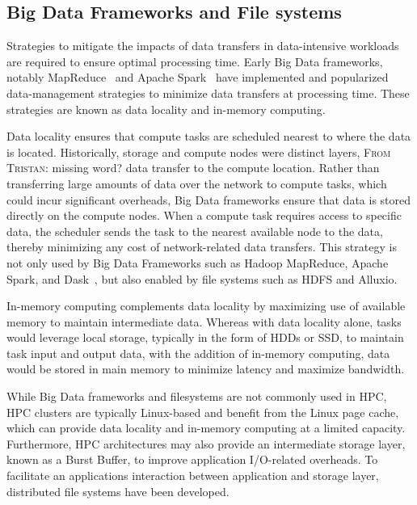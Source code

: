 \documentclass[10pt,journal,compsoc]{IEEEtran}
\newcommand{\TG}[1]{\color{red}\textsc{From Tristan}: #1\xspace\color{black}}
\begin{document}
\subsection{Big Data Frameworks and File systems}

      Strategies to mitigate the impacts of data transfers in data-intensive
      workloads are required to ensure optimal processing time. Early Big Data
      frameworks, notably MapReduce~\cite{dean2008mapreduce} and Apache
      Spark~\cite{zaharia2016apache} have implemented and popularized
      data-management strategies to minimize data transfers at processing time.
      These strategies are known as data locality and in-memory computing.

      Data locality ensures that compute tasks are scheduled nearest to where
      the data is located. Historically, storage and compute nodes were distinct
      layers, \TG{missing word?} data transfer to the compute location. Rather than transferring
      large amounts of data over the network to compute tasks, which could incur
      significant overheads, Big Data frameworks ensure that data is stored
      directly on the compute nodes. When a compute task requires access to
      specific data, the scheduler sends the task to the nearest available node
      to the data, thereby minimizing any cost of network-related data
      transfers. This strategy is not only used by Big Data Frameworks such as
      Hadoop MapReduce, Apache Spark, and Dask~\cite{rocklin2015dask}, but also
      enabled by file systems such as HDFS and Alluxio.

      In-memory computing complements data locality by maximizing use of
      available memory to maintain intermediate data. Whereas with data locality
      alone, tasks would leverage local storage, typically in the form of HDDs
      or SSD, to maintain task input and output data, with the addition of
      in-memory computing, data would be stored in main memory to minimize
      latency and maximize bandwidth.

      While Big Data frameworks and filesystems are not commonly used in HPC,
      HPC clusters are typically Linux-based and benefit from the Linux page
      cache, which can provide data locality and in-memory computing at a
      limited capacity. Furthermore, HPC architectures may also provide an
      intermediate storage layer, known as a Burst Buffer, to improve
      application I/O-related overheads. To facilitate an applications
      interaction between application and storage layer, distributed file
      systems have been developed.
\end{document}
